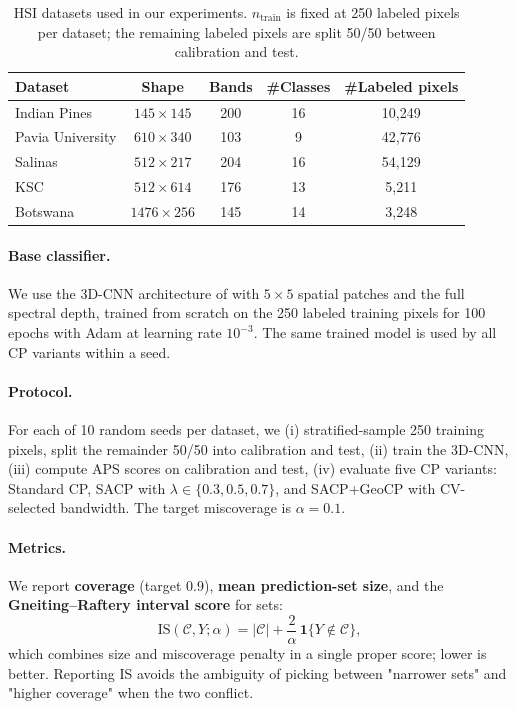 \documentclass[11pt]{article}
\newcommand{\1}{\mathbf{1}}
\begin{document}
\begin{table}[h]
\centering
\small
\caption{HSI datasets used in our experiments. $n_{\text{train}}$ is fixed at 250 labeled pixels per dataset; the remaining labeled pixels are split 50/50 between calibration and test.}
\label{tab:datasets}
\begin{tabular}{lcccc}
\toprule
Dataset & Shape & Bands & \#Classes & \#Labeled pixels \\
\midrule
Indian Pines      & $145 \times 145$   & 200 & 16 & 10{,}249 \\
Pavia University  & $610 \times 340$   & 103 & 9  & 42{,}776 \\
Salinas           & $512 \times 217$   & 204 & 16 & 54{,}129 \\
KSC               & $512 \times 614$   & 176 & 13 & 5{,}211 \\
Botswana          & $1476 \times 256$  & 145 & 14 & 3{,}248 \\
\bottomrule
\end{tabular}
\end{table}

\paragraph{Base classifier.}  We use the 3D-CNN architecture of \citet{hamida20183dcnn} with $5\times5$ spatial patches and the full spectral depth, trained from scratch on the 250 labeled training pixels for 100 epochs with Adam at learning rate $10^{-3}$. The same trained model is used by all CP variants within a seed.

\paragraph{Protocol.}  For each of 10 random seeds per dataset, we (i) stratified-sample 250 training pixels, split the remainder 50/50 into calibration and test, (ii) train the 3D-CNN, (iii) compute APS scores on calibration and test, (iv) evaluate five CP variants: Standard CP, SACP with $\lambda \in \{0.3, 0.5, 0.7\}$, and SACP+GeoCP with CV-selected bandwidth. The target miscoverage is $\alpha = 0.1$.

\paragraph{Metrics.} We report \textbf{coverage} (target 0.9), \textbf{mean prediction-set size}, and the \textbf{Gneiting--Raftery interval score} \citep{gneiting2007strictly} for sets:
\begin{equation}
    \text{IS}(\mathcal{C}, Y; \alpha)
    = |\mathcal{C}| + \frac{2}{\alpha}\,\mathbf{1}\{Y \notin \mathcal{C}\},
    \label{eq:is_set}
\end{equation}
which combines size and miscoverage penalty in a single proper score; lower is better. Reporting IS avoids the ambiguity of picking between "narrower sets" and "higher coverage" when the two conflict.
\end{document}
